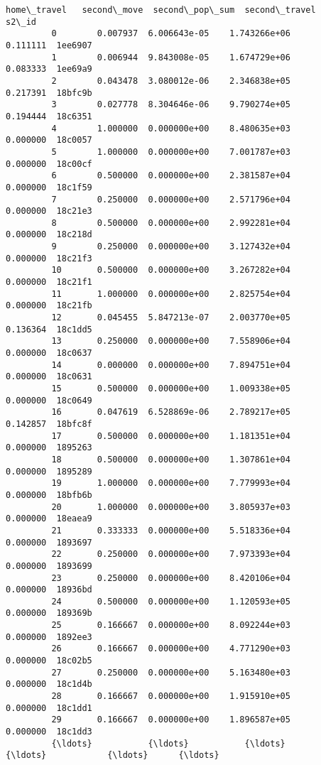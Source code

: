 \documentclass[11pt]{article}
\begin{document}
\begin{Verbatim}[commandchars=\\\{\}]
               home\_travel   second\_move  second\_pop\_sum  second\_travel    s2\_id  
         0        0.007937  6.006643e-05    1.743266e+06       0.111111  1ee6907  
         1        0.006944  9.843008e-05    1.674729e+06       0.083333  1ee69a9  
         2        0.043478  3.080012e-06    2.346838e+05       0.217391  18bfc9b  
         3        0.027778  8.304646e-06    9.790274e+05       0.194444  18c6351  
         4        1.000000  0.000000e+00    8.480635e+03       0.000000  18c0057  
         5        1.000000  0.000000e+00    7.001787e+03       0.000000  18c00cf  
         6        0.500000  0.000000e+00    2.381587e+04       0.000000  18c1f59  
         7        0.250000  0.000000e+00    2.571796e+04       0.000000  18c21e3  
         8        0.500000  0.000000e+00    2.992281e+04       0.000000  18c218d  
         9        0.250000  0.000000e+00    3.127432e+04       0.000000  18c21f3  
         10       0.500000  0.000000e+00    3.267282e+04       0.000000  18c21f1  
         11       1.000000  0.000000e+00    2.825754e+04       0.000000  18c21fb  
         12       0.045455  5.847213e-07    2.003770e+05       0.136364  18c1dd5  
         13       0.250000  0.000000e+00    7.558906e+04       0.000000  18c0637  
         14       0.000000  0.000000e+00    7.894751e+04       0.000000  18c0631  
         15       0.500000  0.000000e+00    1.009338e+05       0.000000  18c0649  
         16       0.047619  6.528869e-06    2.789217e+05       0.142857  18bfc8f  
         17       0.500000  0.000000e+00    1.181351e+04       0.000000  1895263  
         18       0.500000  0.000000e+00    1.307861e+04       0.000000  1895289  
         19       1.000000  0.000000e+00    7.779993e+04       0.000000  18bfb6b  
         20       1.000000  0.000000e+00    3.805937e+03       0.000000  18eaea9  
         21       0.333333  0.000000e+00    5.518336e+04       0.000000  1893697  
         22       0.250000  0.000000e+00    7.973393e+04       0.000000  1893699  
         23       0.250000  0.000000e+00    8.420106e+04       0.000000  18936bd  
         24       0.500000  0.000000e+00    1.120593e+05       0.000000  189369b  
         25       0.166667  0.000000e+00    8.092244e+03       0.000000  1892ee3  
         26       0.166667  0.000000e+00    4.771290e+03       0.000000  18c02b5  
         27       0.250000  0.000000e+00    5.163480e+03       0.000000  18c1d4b  
         28       0.166667  0.000000e+00    1.915910e+05       0.000000  18c1dd1  
         29       0.166667  0.000000e+00    1.896587e+05       0.000000  18c1dd3  
         {\ldots}           {\ldots}           {\ldots}             {\ldots}            {\ldots}      {\ldots}  

\end{Verbatim}
\end{document}
